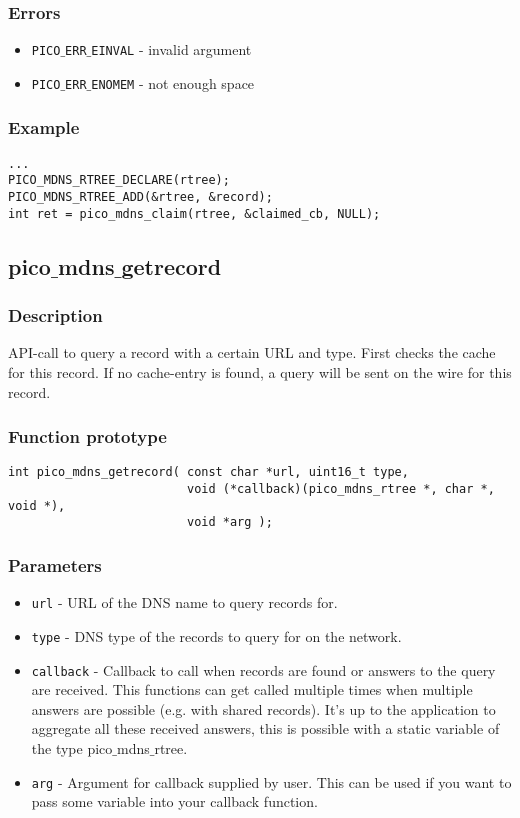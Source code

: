 \subsubsection*{Errors}
\begin{itemize}[noitemsep]
\item \texttt{PICO$\_$ERR$\_$EINVAL} - invalid argument
\item \texttt{PICO$\_$ERR$\_$ENOMEM} - not enough space
\end{itemize}

\subsubsection*{Example}
\begin{verbatim}
...
PICO_MDNS_RTREE_DECLARE(rtree);
PICO_MDNS_RTREE_ADD(&rtree, &record);
int ret = pico_mdns_claim(rtree, &claimed_cb, NULL);
\end{verbatim}


\subsection{pico$\_$mdns$\_$getrecord}

\subsubsection*{Description}
API-call to query a record with a certain URL and type. First checks the cache for this record. If no cache-entry is found, a query will be sent on the wire for this record.

\subsubsection*{Function prototype}
\begin{verbatim}
int pico_mdns_getrecord( const char *url, uint16_t type,
                         void (*callback)(pico_mdns_rtree *, char *, void *),
                         void *arg );
\end{verbatim}

\subsubsection*{Parameters}
\begin{itemize}[noitemsep]
\item \texttt{url} - URL of the DNS name to query records for.
\item \texttt{type} - DNS type of the records to query for on the network.
\item \texttt{callback} - Callback to call when records are found or answers to the query are received. This functions can get called multiple times when multiple answers are possible (e.g. with shared records). It's up to the application to aggregate all these received answers, this is possible with a static variable of the type pico$\_$mdns$\_$rtree.
\item \texttt{arg} - Argument for callback supplied by user. This can be used if you want to pass some variable into your callback function.
\end{itemize}

